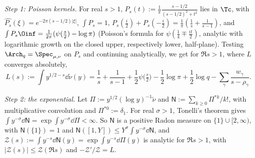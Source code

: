 \emph{Step 1: Poisson kernels.} For real $s>1$, $P_s(t):=\frac1\pi\frac{s-1/2}{(s-1/2)^2+t^2}$ lies in $\Tc$, with
$\widehat{P_s}(\xi)=e^{-2\pi(s-1/2)|\xi|}$, $\int P_s=1$, $P_s(\frac i2)+P_s(-\frac i2)=\frac1\pi(\frac1s+\frac1{s-1})$, and
$\int P_s\Oinf=\frac1{2\pi}(\psi(\frac s2)-\log\pi)$ (Poisson's formula for $\psi(\frac14\mp\frac{it}2)$, analytic with logarithmic growth on
the closed upper, respectively lower, half-plane). Testing $\Arch_q=\Spec_{\mu,\nu}$ on $P_s$ and continuing analytically, we
get for $\Re s>1$, where $L$ converges absolutely,
\begin{equation}\label{eq:int-L}
L(s):=\int y^{1/2-s}\dd\tilde\nu(y)=\frac1s+\frac1{s-1}+\frac12\psi\big(\tfrac s2\big)-\frac12\log\pi+\frac12\log q-\sum_\gamma\frac{w_\gamma}{s-\rho_\gamma}.
\end{equation}

\emph{Step 2: the exponential.} Let $\Pi:=y^{1/2}(\log y)^{-1}\tilde\nu$ and $\mathsf N:=\sum_{k\ge0}\Pi^{*k}/k!$, with multiplicative convolution and
$\Pi^{*0}:=\delta_1$. For real $\sigma>1$, Tonelli's theorem gives $\int y^{-\sigma}\dd\mathsf N=\exp\int y^{-\sigma}\dd\Pi<\infty$. So $\mathsf N$ is a positive
Radon measure on $\{1\}\cup[2,\infty)$, with $\mathsf N(\{1\})=1$ and $\mathsf N([1,Y])\le Y^\sigma\int y^{-\sigma}\dd\mathsf N$, and
$\mathcal Z(s):=\int y^{-s}\dd\mathsf N(y)=\exp\int y^{-s}\dd\Pi(y)$ is analytic for $\Re s>1$, with $|\mathcal Z(s)|\le\mathcal Z(\Re s)$ and $-\mathcal Z'/\mathcal Z=L$.

